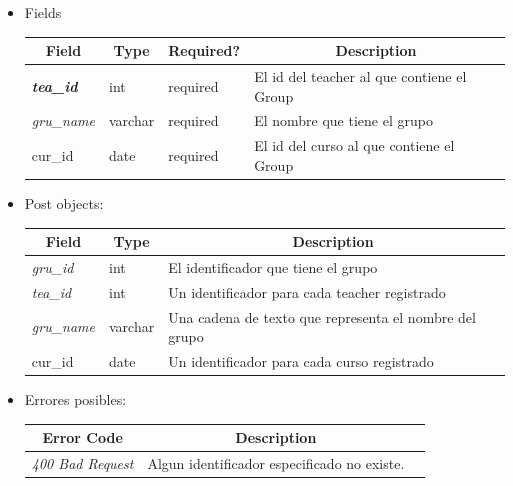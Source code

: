 \documentclass{article}
\begin{document}
\begin{enumerate}
\begin{itemize}
        \item Fields
        \begin{table}[H] \centering \begin{tabular}{|l|l|l|l|} \hline
        \multicolumn{1}{|c|}{\textbf{Field}} &
        \multicolumn{1}{c|}{\textbf{Type}} &
        \multicolumn{1}{c|}{\textbf{Required?}} &
        \multicolumn{1}{c|}{\textbf{Description}} \\ \hline
        \textit{\textbf{tea\_id}} & int & required & El id del teacher al que
        contiene el Group \\ \hline \textit{gru\_name} & varchar & required & El
        nombre que tiene el grupo \\ \hline cur\_id & date & required & El id
        del curso al que contiene el Group \\ \hline \end{tabular} \end{table}
        \item Post objects:
        \begin{table}[H] \centering \begin{tabular}{|l|l|l|} \hline
        \multicolumn{1}{|c|}{\textbf{Field}} &
        \multicolumn{1}{c|}{\textbf{Type}} &
        \multicolumn{1}{c|}{\textbf{Description}} \\ \hline \textit{gru\_id} &
        int & El identificador que tiene el grupo \\ \hline \textit{tea\_id} &
        int & Un identificador para cada teacher registrado \\ \hline
        \textit{gru\_name} & varchar & Una cadena de texto que representa el
        nombre del grupo \\ \hline cur\_id & date & Un identificador para cada
        curso registrado \\ \hline \end{tabular} \end{table}
        \item Errores posibles: \begin{table}[H] \centering
        \begin{tabular}{|c|c|l|} \hline \textbf{Error Code} &
        \textbf{Description} \\ \hline \textit{400 Bad Request} & Algun
        identificador especificado no existe. \\ \hline \end{tabular}
        \end{table}
    \end{itemize}


\end{enumerate}
\end{document}
